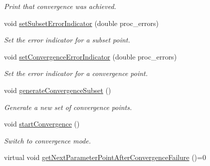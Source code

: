 \begin{DoxyCompactItemize}
\begin{DoxyCompactList}\small\item\em Print that convergence was achieved. \end{DoxyCompactList}\item 
void \hyperlink{class_c_a_r_o_m_1_1_greedy_parameter_point_sampler_a3540229b83be8da1b15bd66b84912b88}{set\-Subset\-Error\-Indicator} (double proc\-\_\-errors)
\begin{DoxyCompactList}\small\item\em Set the error indicator for a subset point. \end{DoxyCompactList}\item 
void \hyperlink{class_c_a_r_o_m_1_1_greedy_parameter_point_sampler_ae46c8c2638d5cf8c3070ad9b668100ec}{set\-Convergence\-Error\-Indicator} (double proc\-\_\-errors)
\begin{DoxyCompactList}\small\item\em Set the error indicator for a convergence point. \end{DoxyCompactList}\item 
\hypertarget{class_c_a_r_o_m_1_1_greedy_parameter_point_sampler_ad015bbf5a0b877177101545b249fdd37}{void \hyperlink{class_c_a_r_o_m_1_1_greedy_parameter_point_sampler_ad015bbf5a0b877177101545b249fdd37}{generate\-Convergence\-Subset} ()}\label{class_c_a_r_o_m_1_1_greedy_parameter_point_sampler_ad015bbf5a0b877177101545b249fdd37}

\begin{DoxyCompactList}\small\item\em Generate a new set of convergence points. \end{DoxyCompactList}\item 
\hypertarget{class_c_a_r_o_m_1_1_greedy_parameter_point_sampler_a3edd3a853f6b5242ea12eb8da8a13a62}{void \hyperlink{class_c_a_r_o_m_1_1_greedy_parameter_point_sampler_a3edd3a853f6b5242ea12eb8da8a13a62}{start\-Convergence} ()}\label{class_c_a_r_o_m_1_1_greedy_parameter_point_sampler_a3edd3a853f6b5242ea12eb8da8a13a62}

\begin{DoxyCompactList}\small\item\em Switch to convergence mode. \end{DoxyCompactList}\item 
\hypertarget{class_c_a_r_o_m_1_1_greedy_parameter_point_sampler_ac0d509c070bfbfb56169cd6798966234}{virtual void \hyperlink{class_c_a_r_o_m_1_1_greedy_parameter_point_sampler_ac0d509c070bfbfb56169cd6798966234}{get\-Next\-Parameter\-Point\-After\-Convergence\-Failure} ()=0}\label{class_c_a_r_o_m_1_1_greedy_parameter_point_sampler_ac0d509c070bfbfb56169cd6798966234}


\end{DoxyCompactItemize}
